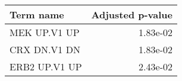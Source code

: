 \begin{tabular}{lr}
\toprule
    Term name &  Adjusted p-value \\
\midrule
 MEK UP.V1 UP &          1.83e-02 \\
 CRX DN.V1 DN &          1.83e-02 \\
ERB2 UP.V1 UP &          2.43e-02 \\
\bottomrule
\end{tabular}
